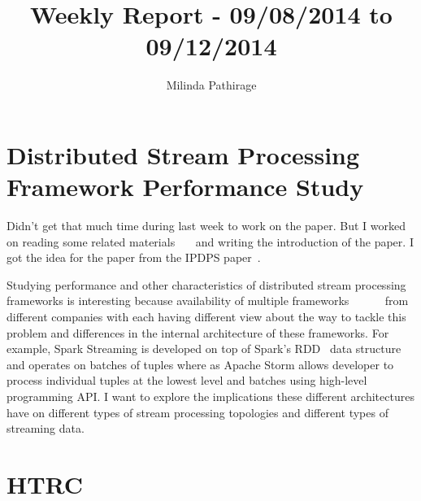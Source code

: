 \documentclass{article}
\begin{document}
\title{Weekly Report - 09/08/2014 to 09/12/2014}
\author{Milinda Pathirage}

\maketitle

\section{Distributed Stream Processing Framework Performance Study}

Didn't get that much time during last week to work on the paper. But I
worked on reading some related materials~\cite{desurvey}~\cite{dimsonhailstorm}~\cite{guo2013well} and writing the introduction
of the paper. I got the idea for the paper from the IPDPS
paper~\cite{guo2013well}.

Studying performance and other characteristics of distributed stream
processing frameworks is interesting because availability of multiple
frameworks~\cite{toshniwal2014storm}~\cite{asf:2014:samza}~\cite{neumeyer2010s4} ~\cite{zaharia2013discretized,}~\cite{akidau2013millwheel}
from different companies with each having different view
about the way to tackle this problem and differences in the internal
architecture of these frameworks. For example, Spark Streaming is
developed on top of Spark's RDD~\cite{zaharia2012resilient} data
structure and operates on batches of tuples where as Apache Storm
allows developer to process individual tuples at the lowest level and
batches using high-level programming API. I want to explore the
implications these different architectures have on different types of
stream processing topologies and different types of streaming data.


\section{HTRC}
\end{document}
